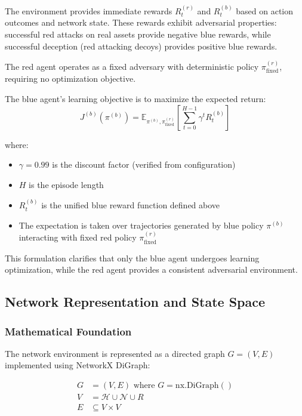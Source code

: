 \documentclass[12pt,twoside]{article}
\begin{document}
The environment provides immediate rewards $R_t^{(r)}$ and $R_t^{(b)}$ based on action outcomes and network state. These rewards exhibit adversarial properties: successful red attacks on real assets provide negative blue rewards, while successful deception (red attacking decoys) provides positive blue rewards.

The red agent operates as a fixed adversary with deterministic policy $\pi^{(r)}_{\text{fixed}}$, requiring no optimization objective.

The blue agent's learning objective is to maximize the expected return:
\begin{equation}
J^{(b)}(\pi^{(b)}) = \mathbb{E}_{\pi^{(b)}, \pi^{(r)}_{\text{fixed}}}\left[\sum_{t=0}^{H-1} \gamma^t R_t^{(b)}\right]
\end{equation}

where:
\begin{itemize}
\item $\gamma = 0.99$ is the discount factor (verified from configuration)
\item $H$ is the episode length 
\item $R_t^{(b)}$ is the unified blue reward function defined above
\item The expectation is taken over trajectories generated by blue policy $\pi^{(b)}$ interacting with fixed red policy $\pi^{(r)}_{\text{fixed}}$
\end{itemize}

This formulation clarifies that only the blue agent undergoes learning optimization, while the red agent provides a consistent adversarial environment.

\subsection{Network Representation and State Space}

\subsubsection{Mathematical Foundation}
The network environment is represented as a directed graph $G = (V, E)$ implemented using NetworkX DiGraph:

\begin{align}
G &= (V, E) \text{ where } G = \text{nx.DiGraph}() \\
V &= \mathcal{H} \cup \mathcal{N} \cup R \\
E &\subseteq V \times V
\end{align}
\end{document}
